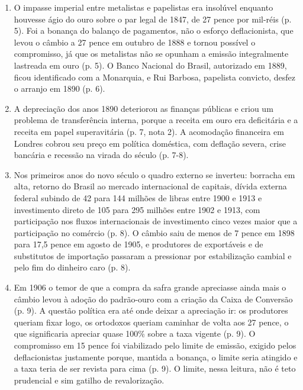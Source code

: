 \begin{enumerate}[leftmargin=*,nosep]
\item O impasse imperial entre metalistas e papelistas era insolúvel enquanto houvesse ágio do ouro sobre o par legal de 1847, de 27 pence por mil-réis (p. 5). Foi a bonança do balanço de pagamentos, não o esforço deflacionista, que levou o câmbio a 27 pence em outubro de 1888 e tornou possível o compromisso, já que os metalistas não se opunham a emissão integralmente lastreada em ouro (p. 5). O Banco Nacional do Brasil, autorizado em 1889, ficou identificado com a Monarquia, e Rui Barbosa, papelista convicto, desfez o arranjo em 1890 (p. 6).

\item A depreciação dos anos 1890 deteriorou as finanças públicas e criou um problema de transferência interna, porque a receita em ouro era deficitária e a receita em papel superavitária (p. 7, nota 2). A acomodação financeira em Londres cobrou seu preço em política doméstica, com deflação severa, crise bancária e recessão na virada do século (p. 7-8).

\item Nos primeiros anos do novo século o quadro externo se inverteu: borracha em alta, retorno do Brasil ao mercado internacional de capitais, dívida externa federal subindo de 42 para 144 milhões de libras entre 1900 e 1913 e investimento direto de 105 para 295 milhões entre 1902 e 1913, com participação nos fluxos internacionais de investimento cinco vezes maior que a participação no comércio (p. 8). O câmbio saiu de menos de 7 pence em 1898 para 17,5 pence em agosto de 1905, e produtores de exportáveis e de substitutos de importação passaram a pressionar por estabilização cambial e pelo fim do dinheiro caro (p. 8).

\item Em 1906 o temor de que a compra da safra grande apreciasse ainda mais o câmbio levou à adoção do padrão-ouro com a criação da Caixa de Conversão (p. 9). A questão política era até onde deixar a apreciação ir: os produtores queriam fixar logo, os ortodoxos queriam caminhar de volta aos 27 pence, o que significaria apreciar quase 100\% sobre a taxa vigente (p. 9). O compromisso em 15 pence foi viabilizado pelo limite de emissão, exigido pelos deflacionistas justamente porque, mantida a bonança, o limite seria atingido e a taxa teria de ser revista para cima (p. 9). O limite, nessa leitura, não é teto prudencial e sim gatilho de revalorização.


\end{enumerate}
